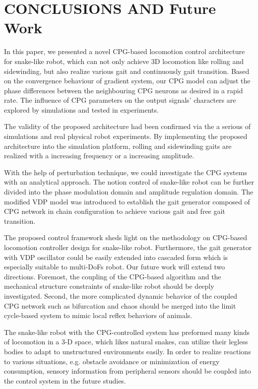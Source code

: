 \documentclass[letterpaper, 10 pt, conference]{ieeeconf}
\begin{document}
\section{CONCLUSIONS AND Future Work}

In this paper, we presented a novel CPG-based locomotion control architecture for snake-like robot, which can not only achieve 3D locomotion like rolling and sidewinding, but also realize various gait and continuously gait transition.
Based on the convergence behaviour of gradient system, our CPG model can adjust the phase differences between the neighbouring CPG neurons as desired in a rapid rate. The influence of CPG parameters on the output signals' characters are explored by simulations and tested in experiments.


The validity of the proposed architecture had been confirmed via the a serious of simulations and real physical robot experiments.
By implementing the proposed architecture into the simulation platform, rolling and sidewinding gaits are realized with a increasing frequency or a increasing amplitude.

With the help of perturbation technique, we could investigate the CPG systems with an analytical approach. The notion control of snake-like robot can be further divided into the phase modulation domain and amplitude regulation domain. The modified VDP model was introduced to establish the gait generator composed of CPG network in chain configuration to achieve various gait and free gait transition.

The proposed control framework sheds light on the methodology on CPG-based locomotion controller design for snake-like robot. Furthermore, the gait generator with VDP oscillator could be easily extended into cascaded form which is especially suitable to multi-DoFs robot. Our future work will extend two directions. Foremost, the coupling of the CPG-based algorithm and the mechanical structure constraints of snake-like robot should be deeply investigated. Second, the more complicated dynamic behavior of the coupled CPG network such as bifurcation and chaos should be merged into the limit cycle-based system to mimic local reflex behaviors of animals.

The snake-like robot with the CPG-controlled system has preformed many kinds of locomotion in a 3-D space, which likes natural snakes, can utilize their legless bodies to adapt to unstructured environments easily. In order to realize reactions to various situations, e.g. obstacle avoidance or minimization of energy consumption, sensory information from peripheral sensors should be coupled into the control system in the future studies.




\end{document}

